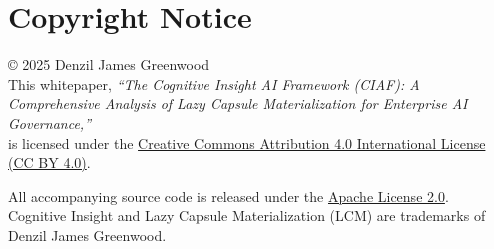 \documentclass[12pt,a4paper]{article}
\begin{document}
\section*{Copyright Notice}

© 2025 Denzil James Greenwood \\
This whitepaper, \textit{``The Cognitive Insight AI Framework (CIAF): A Comprehensive Analysis of Lazy Capsule Materialization for Enterprise AI Governance,''} \\
is licensed under the \href{https://creativecommons.org/licenses/by/4.0/}{Creative Commons Attribution 4.0 International License (CC BY 4.0)}.

All accompanying source code is released under the \href{https://www.apache.org/licenses/LICENSE-2.0}{Apache License 2.0}. \\
Cognitive Insight\texttrademark{} and Lazy Capsule Materialization (LCM)\texttrademark{} are trademarks of Denzil James Greenwood.
\end{document}

